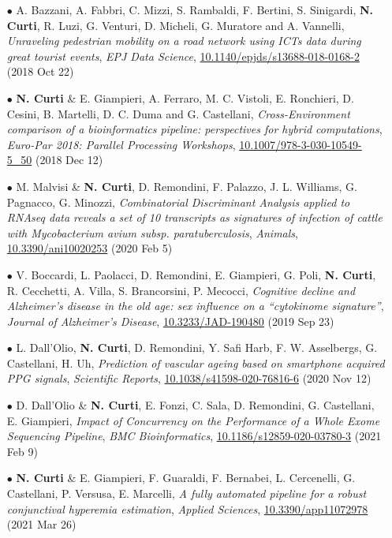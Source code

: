 \documentclass[a4paper,11pt]{article}
\newcommand{\quotes}[1]{``#1''}
\begin{document}
\begin{itemize}

  \item[$\bullet$] A. Bazzani, A. Fabbri, C. Mizzi, S. Rambaldi, F. Bertini, S. Sinigardi, \textbf{N. Curti}, R. Luzi, G. Venturi, D. Micheli, G. Muratore and A. Vannelli, \emph{Unraveling pedestrian mobility on a road network using ICTs data during great tourist events}, \emph{EPJ Data Science}, \url{10.1140/epjds/s13688-018-0168-2} (2018 Oct 22)

  \item[$\bullet$] \textbf{N. Curti} \& E. Giampieri, A. Ferraro, M. C. Vistoli, E. Ronchieri, D. Cesini, B. Martelli, D. C. Duma and G. Castellani, \emph{Cross-Environment comparison of a bioinformatics pipeline: perspectives for hybrid computations}, \emph{Euro-Par 2018: Parallel Processing Workshops}, \url{10.1007/978-3-030-10549-5_50} (2018 Dec 12)

  \item[$\bullet$] M. Malvisi \& \textbf{N. Curti}, D. Remondini, F. Palazzo, J. L. Williams, G. Pagnacco, G. Minozzi, \emph{Combinatorial Discriminant Analysis applied to RNAseq data reveals a set of 10 transcripts as signatures of infection of cattle with Mycobacterium avium subsp. paratuberculosis}, \emph{Animals}, \url{10.3390/ani10020253} (2020 Feb 5)

  \item[$\bullet$] V. Boccardi, L. Paolacci, D. Remondini, E. Giampieri, G. Poli, \textbf{N. Curti}, R. Cecchetti, A. Villa, S. Brancorsini, P. Mecocci, \emph{Cognitive decline and Alzheimer's disease in the old age: sex influence on a \quotes{cytokinome signature}}, \emph{Journal of Alzheimer's Disease}, \url{10.3233/JAD-190480} (2019 Sep 23)

  \item[$\bullet$] L. Dall'Olio, \textbf{N. Curti}, D. Remondini, Y. Safi Harb, F. W. Asselbergs, G. Castellani, H. Uh, \emph{Prediction of vascular ageing based on smartphone acquired PPG signals}, \emph{Scientific Reports}, \url{10.1038/s41598-020-76816-6} (2020 Nov 12)

  \item[$\bullet$] D. Dall'Olio \& \textbf{N. Curti}, E. Fonzi, C. Sala, D. Remondini, G. Castellani, E. Giampieri, \emph{Impact of Concurrency on the Performance of a Whole Exome Sequencing Pipeline}, \emph{BMC Bioinformatics}, \url{10.1186/s12859-020-03780-3} (2021 Feb 9)

  \item[$\bullet$] \textbf{N. Curti} \& E. Giampieri, F. Guaraldi, F. Bernabei, L. Cercenelli, G. Castellani, P. Versusa, E. Marcelli, \emph{A fully automated pipeline for a robust conjunctival hyperemia estimation}, \emph{Applied Sciences}, \url{10.3390/app11072978} (2021 Mar 26)


\end{itemize}
\end{document}
